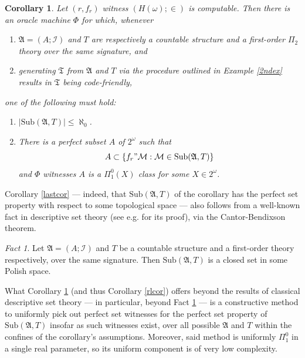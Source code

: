 \documentclass[12pt, twoside]{memoir}
\numberwithin{equation}{section}
\newtheorem{cor}[thm]{Corollary}
\theoremstyle{definition}
\theoremstyle{remark}
\newtheorem{fact}[thm]{Fact}
\theoremstyle{definition}
\theoremstyle{definition}
\theoremstyle{definition}
\theoremstyle{remark}
\begin{document}
\begin{cor}\label{rlcor2nd}
Let $(r, f_r)$ witness $(H(\omega); \in)$ is computable. Then there is an oracle machine $\Phi$ for which, whenever 
\begin{enumerate}[label=(\alph*)]
    \item $\mathfrak{A} = (A; \mathcal{I})$ and $T$ are respectively a countable structure and a first-order $\Pi_2$ theory over the same signature, and
    \item generating $\mathfrak{T}$ from $\mathfrak{A}$ and $T$ via the procedure outlined in Example \ref{2ndex} results in $\mathfrak{T}$ being code-friendly,
\end{enumerate} 
one of the following must hold:
\begin{enumerate}[label=(\arabic*)]
    \item $|\mathrm{Sub}(\mathfrak{A}, T)| \leq \aleph_0$.
    \item There is a perfect subset $A$ of $2^{\omega}$ such that $$A \subset \{f_r" \mathcal{M} : \mathcal{M} \in \mathrm{Sub}(\mathfrak{A}, T)\}$$ and $\Phi$ witnesses $A$ is a $\Pi^0_1(X)$ class for some $X \in 2^{\omega}$.
\end{enumerate}
\end{cor}

Corollary \ref{lastcor} --- indeed, that $\mathrm{Sub}(\mathfrak{A}, T)$ of the corollary has the perfect set property with respect to some topological space --- also follows from a well-known fact in descriptive set theory (see e.g. \cite{kechris} for its proof), via the Cantor-Bendixson theorem. 

\begin{fact}\label{lastfact}
Let $\mathfrak{A} = (A; \mathcal{I})$ and $T$ be a countable structure and a first-order theory respectively, over the same signature. Then $\mathrm{Sub}(\mathfrak{A}, T)$ is a closed set in some Polish space.
\end{fact}

What Corollary \ref{rlcor2nd} (and thus Corollary \ref{rlcor}) offers beyond the results of classical descriptive set theory --- in particular, beyond Fact \ref{lastfact} --- is a constructive method to uniformly pick out perfect set witnesses for the perfect set property of $\mathrm{Sub}(\mathfrak{A}, T)$ insofar as such witnesses exist, over all possible $\mathfrak{A}$ and $T$ within the confines of the corollary's assumptions. Moreover, said method is uniformly $\Pi^0_1$ in a single real parameter, so its uniform component is of very low complexity.
\end{document}
